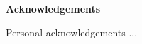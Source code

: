 \vspace*{1.5 cm}
{\Large
    \noindent
    {\bf Acknowledgements}} \\
    \vspace*{0.3 cm}
    
\noindent
Personal acknowledgements ...